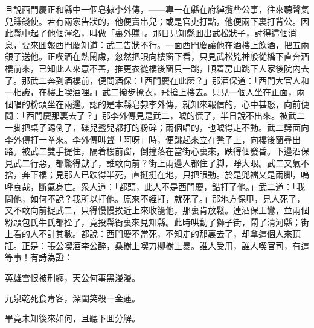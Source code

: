且說西門慶正和縣中一個皂隸李外傳，——專一在縣在府綽攬些公事，往來聽聲氣兒賺錢使。若有兩家告狀的，他便賣串兒；或是官吏打點，他便兩下裏打背公。因此縣中起了他個渾名，叫做「裏外賺」。那日見知縣囬出武松狀子，討得這個消息，要來囬報西門慶知道：武二告狀不行。一面西門慶讓他在酒樓上飲酒，把五兩銀子送他。正喫酒在熱鬧䖏，忽然把眼向樓窗下看，只見武松兇神般從橋下直奔酒樓前來，已知此人來意不善，推更衣從樓後窗只一跳，順着房山跳下人家後院内去了。那武二奔到酒樓前，便問酒保：「西門慶在此麽？」那酒保道：「西門大官人和一相識，在樓上喫酒哩。」武二撥步撩衣，飛搶上樓去。只見一個人坐在正面，兩個唱的粉頭坐在兩邊。認的是本縣皂隸李外傳，就知來報信的，心中甚怒，向前便問：「西門慶那裏去了？」那李外傳見是武二，唬的慌了，半日說不出來。被武二一脚把桌子踢倒了，碟兒盞兒都打的粉碎；兩個唱的，也唬得走不動。武二劈面向李外傳打一拳來。李外傳叫聲「阿呀」時，便跳起來立在凳子上，向樓後窗尋出路。被武二雙手提住，隔着樓前窗，倒撞落在當街心裏來，跌得個發昏。下邊酒保見武二行惡，都驚得獃了，誰敢向前？街上兩邊人都住了脚，睜大眼。武二又氣不捨，奔下樓；見那人已跌得半死，直挺挺在地，只把眼動。於是兜襠又是兩脚，嗚呼哀哉，斷氣身亡。衆人道：「都頭，此人不是西門慶，錯打了他。」武二道：「我問他，如何不說？我所以打他。原來不經打，就死了。」那地方保甲，見人死了，又不敢向前捉武二，只得慢慢挨近上來收籠他，那裏肯放鬆。連酒保王鸞，並兩個粉頭包氏牛氏都拴了，竟投縣衙裏來見知縣。此時哄動了獅子街，鬧了清河縣；街上看的人不計其數。都說：西門慶不當死，不知走的那裏去了，却拿這個人來頂缸。正是：張公喫酒李公醉，桑樹上喫刀柳樹上暴。誰人受用，誰人喫官司，有這等事！有詩為證：
\begin{myquote}
英雄雪恨被刑纏，天公何事黑漫漫。

九泉乾死食毒客，深閨笑殺一金蓮。
\end{myquote}

畢竟未知後來如何，且聽下囬分解。

